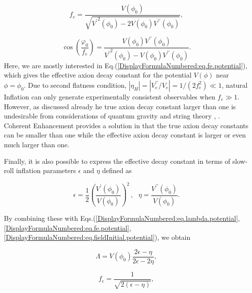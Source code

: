 \documentclass[12pt]{article}
\begin{document}
\begin{equation}\label{DisplayFormulaNumbered:eq.fe.potential}
  f_e=\frac{V\left(\phi_0\right)}{\sqrt{{V^\prime}^2\left(\phi_0\right)-2V\left(\phi_0\right)V^{\prime\prime} \left(\phi_0\right)}},
\end{equation}

\begin{equation}\label{DisplayFormulaNumbered:eq.fieldInitial.potential}
  \cos\left(\frac{\varphi_0}{f_e}\right)=\frac{V\left(\phi_0\right)V^{\prime\prime} \left(\phi_0\right)}{{V^\prime}^2\left(\phi_0\right)-V\left(\phi_0\right)V^{\prime\prime} \left(\phi_0\right)}.
\end{equation}
Here, we are mostly interested in Eq.(\ref{DisplayFormulaNumbered:eq.fe.potential}), which gives the effective axion decay constant for the potential $V\left(\phi \right)$ near $\phi =\phi_0$.
Due to second flatness condition, $\left|\eta_H\right|=\left| V_e^{\prime\prime} /V_e \right|=1/\left(2f_e^2\right) \ll 1$, natural Inflation can only generate experimentally consistent observables when $f_e \gg 1$. However, as discussed already he true axion decay constant larger than one is undesirable from considerations of quantum gravity and string theory \cite{Kallosh:1995hi}, \cite{Banks:2003sx}. Coherent Enhancement provides a solution in that the true axion decay constants can be smaller than one while the effective axion decay constant is larger or even much
larger than one.

Finally, it is also possible to express the effective decay constant in terms of slow-roll inflation parameters $\epsilon$ and $\eta$ defined as

\begin{equation}\label{DisplayFormulaNumbered:eq.epsilonV}
  \epsilon=\frac{1}{2}{\left(\frac{V^\prime \left(\phi_0\right)}{V\left(\phi_0\right)}\right)}^2\,,
  ~~~\eta=\frac{V^{\prime\prime} \left(\phi_0\right)}{V\left(\phi_0\right)}.
\end{equation}

By combining these with Eqs.(\ref{DisplayFormulaNumbered:eq.lambda.potential}, \ref{DisplayFormulaNumbered:eq.fe.potential}, \ref{DisplayFormulaNumbered:eq.fieldInitial.potential}), we obtain

\begin{equation}\label{DisplayFormulaNumbered:eq.lambda.slowRoll}
  \Lambda =V\left(\phi_0\right)\frac{2\epsilon-\eta}{2\epsilon-2\eta},
\end{equation}

\begin{equation}\label{DisplayFormulaNumbered:eq.fe.slowRoll}
  f_e=\frac{1}{\sqrt{2\left(\epsilon-\eta\right)}},
\end{equation}
\end{document}
